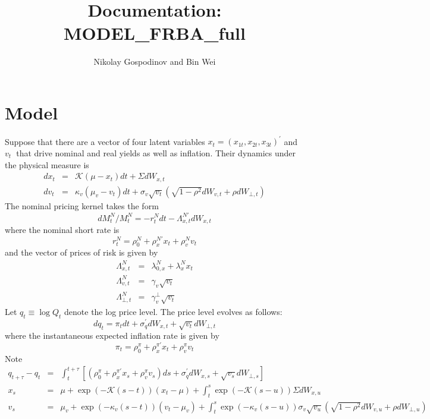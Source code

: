 \documentclass{article}
\begin{document}
\title{Documentation: MODEL\_FRBA\_full}
\author{Nikolay Gospodinov and Bin Wei}
\maketitle

\section{Model}

Suppose that there are a vector of four latent variables $x_{t}=\left(
x_{1t},x_{2t},x_{3t}\right) ^{\prime }$ and $v_{t}$\textbf{\ }that drive
nominal and real yields as well as inflation. Their dynamics under the
physical measure is%
\begin{eqnarray}
dx_{t} &=&\mathcal{K}\left( \mu -x_{t}\right) dt+\Sigma dW_{x,t} \\
dv_{t} &=&\kappa _{v}\left( \mu _{v}-v_{t}\right) dt+\sigma _{v}\sqrt{v_{t}}%
\left( \sqrt{1-\rho ^{2}}dW_{v,t}+\rho dW_{\bot ,t}\right) 
\end{eqnarray}%
The nominal pricing kernel takes the form%
\begin{equation}
dM_{t}^{N}/M_{t}^{N}=-r_{t}^{N}dt-\Lambda _{x,t}^{N\prime }dW_{x,t}
\end{equation}%
where the nominal short rate is%
\begin{equation}
r_{t}^{N}=\rho _{0}^{N}+\rho _{x}^{N\prime }x_{t}+\rho _{v}^{N}v_{t}
\end{equation}%
and the vector of prices of risk is given by\qquad 
\begin{eqnarray*}
\Lambda _{x,t}^{N} &=&\lambda _{0,x}^{N}+\lambda _{x}^{N}x_{t} \\
\Lambda _{v,t}^{N} &=&\gamma _{v}\sqrt{v_{t}} \\
\Lambda _{\bot ,t}^{N} &=&\gamma _{v}^{\bot }\sqrt{v_{t}}
\end{eqnarray*}%
Let $q_{t}\equiv \log Q_{t}$ denote the log price level. The price level
evolves as follows: 
\begin{equation}
dq_{t}=\pi _{t}dt+\sigma _{q}^{\prime }dW_{x,t}+\sqrt{v_{t}}dW_{\bot ,t}
\end{equation}%
where the instantaneous expected inflation rate is given by 
\begin{equation}
\pi _{t}=\rho _{0}^{\pi }+\rho _{x}^{\pi \prime }x_{t}+\rho _{v}^{\pi }v_{t}
\end{equation}%
Note 
\begin{eqnarray*}
q_{t+\tau }-q_{t} &=&\int_{t}^{t+\tau }\left[ \left( \rho _{0}^{\pi }+\rho
_{x}^{\pi \prime }x_{s}+\rho _{v}^{\pi }v_{s}\right) ds+\sigma _{q}^{\prime
}dW_{x,s}+\sqrt{v_{s}}dW_{\bot ,s}\right]  \\
x_{s} &=&\mu +\exp \left( -\mathcal{K}\left( s-t\right) \right) \left(
x_{t}-\mu \right) +\int_{t}^{s}\exp \left( -\mathcal{K}\left( s-u\right)
\right) \Sigma dW_{x,u} \\
v_{s} &=&\mu _{v}+\exp \left( -\kappa _{v}\left( s-t\right) \right) \left(
v_{t}-\mu _{v}\right) +\int_{t}^{s}\exp \left( -\kappa _{v}\left( s-u\right)
\right) \sigma _{v}\sqrt{v_{u}}\left( \sqrt{1-\rho ^{2}}dW_{v,u}+\rho
dW_{\bot ,u}\right) 
\end{eqnarray*}%
\end{document}
